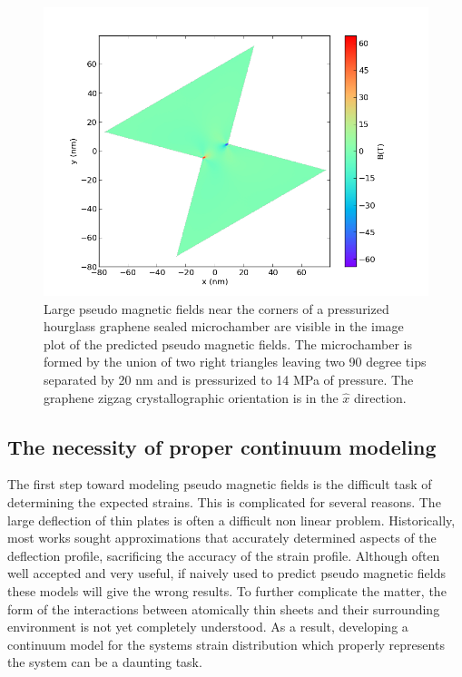 \begin{figure} 
  \begin{center}
  \includegraphics[scale=.75]{Figs_PVP/HourGlass_PMF.png}
  \end{center}
  \caption[Large pseudo magnetic fields near the corners of a pressurized hourglass graphene sealed microchamber]{\label{fig:PVP:hourglass_PMF} Large pseudo magnetic fields near the corners of a pressurized hourglass graphene sealed microchamber are visible in the image plot of the predicted pseudo magnetic fields. The microchamber is formed by the union of two right triangles leaving two 90 degree tips separated by 20 nm and is pressurized to 14 MPa of pressure. The graphene zigzag crystallographic orientation is in the $\hat{x}$ direction.}
\end{figure}

\subsection{The necessity of proper continuum modeling}
The first step toward modeling pseudo magnetic fields is the difficult task of determining the expected strains.
This is complicated for several reasons.
The large deflection of thin plates is often a difficult non linear problem.
Historically, most works sought approximations that accurately determined aspects of the deflection profile, sacrificing the accuracy of the strain profile.
Although often well accepted and very useful, if naively used to predict pseudo magnetic fields these models will give the wrong results.
To further complicate the matter, the form of the interactions between atomically thin sheets and their surrounding environment is not yet completely understood.
As a result, developing a continuum model for the systems strain distribution which properly represents the system can be a daunting task.

